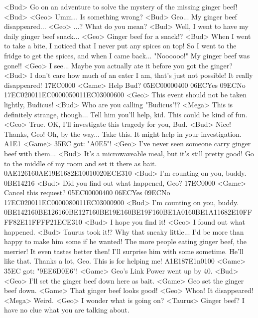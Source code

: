 <Bud> Go on an adventure to solve the mystery of the missing ginger beef! 
<Bud> 
<Geo> Umm... Is something wrong? 
<Bud> Geo... My ginger beef disappeared... 
<Geo> ...? 
What do you mean? 
<Bud> Well, I went to have my daily ginger beef snack... 
<Geo> Ginger beef for a snack!? 
<Bud> When I went to take a bite, I noticed that I never put any spices on top! 
So I went to the fridge to get the spices, and when I came back... 
"Noooooo!" 
My ginger beef was gone!! 
<Geo> I see... 
Maybe you actually ate it before you got the ginger? 
<Bud> I don't care how much of an eater I am, that's just not possible! It really disappeared! 
{17}{EC}{00}{00} 
<Game> Help Bud? {05}{EC}{00}{00}{04}{00}  {06}{EC}Yes   {09}{EC}No 
{17}{EC}{02}{00}{11}{EC}{00}{00}{05}{00}{11}{EC}{03}{00}{06}{00}
<Geo> This event should not be taken lightly, Budicus! 
<Bud> Who are you calling "Budicus"!? 
<Mega> This is definitely strange, though... 
Tell him you'll help, kid. This could be kind of fun. 
<Geo> True. 
OK, I'll investigate this tragedy for you, Bud. 
<Bud> Nice! Thanks, Geo! 
Oh, by the way... 
Take this. It might help in your investigation. 
{A1}{E1} 
<Game> {35}{EC} got: "{A0}{E5}"! 
<Geo> I've never seen someone carry ginger beef with them... 
<Bud> It's a microwaveable meal, but it's still pretty good! 
Go to the middle of my room and set it there as bait. 
{0A}{E1}{26}{16}{0A}{E1}{9E}{16}{82}{E1}0{01}{00}{20}{EC}{E3}{10}
<Bud> I'm counting on you, buddy. 
{0B}{E1}{42}{16}
<Bud> Did you find out what happened, Geo? 
{17}{EC}{00}{00} 
<Game> Cancel this request? {05}{EC}{00}{00}{04}{00}  {06}{EC}Yes   {09}{EC}No 
{17}{EC}{02}{00}{11}{EC}{00}{00}{08}{00}{11}{EC}{03}{00}{09}{00}
<Bud> I'm counting on you, buddy. 
{0B}{E1}{42}{16}{0B}{E1}{26}{16}{0B}{E1}{27}{16}{0B}{E1}{9E}{16}{0B}{E1}{9F}{16}{0B}{E1}{A0}{16}{0B}{E1}{A1}{16}{82}{E1}0{FF}{FF}{82}{E1}1{FF}{FF}{21}{EC}{E3}{10}
<Bud> I hope you find it! 
<Geo> I found out what happened. 
<Bud> Taurus took it!? 
Why that sneaky little... 
I'd be more than happy to make him some if he wanted! 
The more people eating ginger beef, the merrier! It even tastes better then! 
I'll surprise him with some sometime. He'll like that. 
Thanks a lot, Geo. This is for helping me! 
{A1}{E1}{87}{E1}n{01}{00} 
<Game> {35}{EC} got: "{9E}{E6}{D0}{E6}"! 
<Game> Geo's Link Power went up by 40. 
<Bud> 
<Geo> I'll set the ginger beef down here as bait. 
<Game> Geo set the ginger beef down. 
<Game> That ginger beef looks good! 
<Geo> Whoa! It disappeared! 
<Mega> Weird. 
<Geo> I wonder what is going on? 
<Taurus> Ginger beef? 
I have no clue what you are talking about. 
